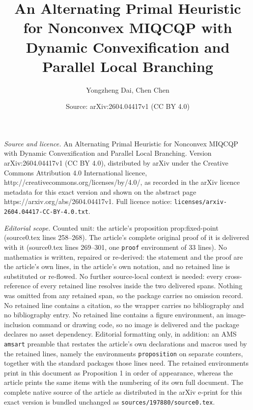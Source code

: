 \documentclass[10pt,a4paper]{amsart}
\title{An Alternating Primal Heuristic for Nonconvex MIQCQP with Dynamic Convexification and Parallel Local Branching}
\author{Yongzheng Dai, Chen Chen}
\date{Source: arXiv:2604.04417v1 (CC BY 4.0)}
\begin{document}
\maketitle

\noindent\emph{Source and licence.} An Alternating Primal Heuristic for Nonconvex MIQCQP with Dynamic Convexification and Parallel Local Branching. Version arXiv:2604.04417v1 (CC BY 4.0), distributed by arXiv under the Creative Commons Attribution 4.0 International licence, http://creativecommons.org/licenses/by/4.0/, as recorded in the arXiv licence metadata for this exact version and shown on the abstract page https://arxiv.org/abs/2604.04417v1. Full licence notice: \texttt{licenses/arxiv-2604.04417-CC-BY-4.0.txt}.\par\smallskip

\noindent\textit{Editorial scope.} Counted unit: the article's proposition prop:fixed-point (source0.tex lines 258--268). The article's complete original proof of it is delivered with it (source0.tex lines 269--301, one \texttt{proof} environment of 33 lines). No mathematics is written, repaired or re-derived: the statement and the proof are the article's own lines, in the article's own notation, and no retained line is substituted or re-flowed.  No further source-local context is needed: every cross-reference of every retained line resolves inside the two delivered spans.  Nothing was omitted from any retained span, so the package carries no omission record.  No retained line contains a citation, so the wrapper carries no bibliography and no bibliography entry.  No retained line contains a figure environment, an image-inclusion command or drawing code, so no image is delivered and the package declares no asset dependency.  Editorial formatting only, in addition: an AMS \texttt{amsart} preamble that restates the article's own declarations and macros used by the retained lines, namely the environments \texttt{proposition} on separate counters, together with the standard packages those lines need.  The retained environments print in this document as Proposition 1 in order of appearance, whereas the article prints the same items with the numbering of its own full document.  The complete native source of the article as distributed in the arXiv e-print for this exact version is bundled unchanged as \texttt{sources/197880/source0.tex}.
\end{document}
